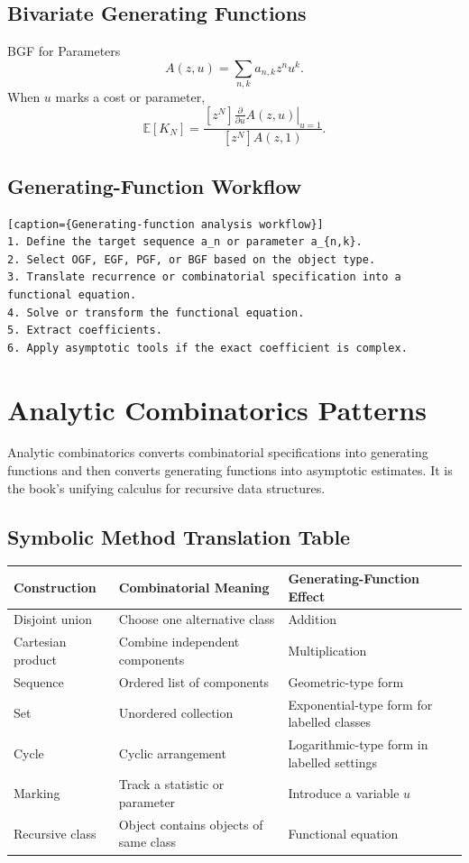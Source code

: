\documentclass[11pt]{article}
\newcommand{\E}{\mathbb{E}}
\begin{document}
\subsection{Bivariate Generating Functions}

\begin{mathbox}{BGF for Parameters}
\[
A(z,u)=\sum_{n,k}a_{n,k}z^nu^k.
\]
When \(u\) marks a cost or parameter,
\[
\E[K_N]
=
\frac{[z^N]\left.\frac{\partial}{\partial u}A(z,u)\right|_{u=1}}
{[z^N]A(z,1)}.
\]
\end{mathbox}

\subsection{Generating-Function Workflow}

\begin{verbatim}[caption={Generating-function analysis workflow}]
1. Define the target sequence a_n or parameter a_{n,k}.
2. Select OGF, EGF, PGF, or BGF based on the object type.
3. Translate recurrence or combinatorial specification into a functional equation.
4. Solve or transform the functional equation.
5. Extract coefficients.
6. Apply asymptotic tools if the exact coefficient is complex.
\end{verbatim}

\section{Analytic Combinatorics Patterns}

Analytic combinatorics converts combinatorial specifications into generating functions and then converts generating functions into asymptotic estimates. It is the book's unifying calculus for recursive data structures.

\subsection{Symbolic Method Translation Table}

\begin{center}
\begin{tabularx}{\textwidth}{L{0.24\textwidth} L{0.25\textwidth} Y}
\toprule
\textbf{Construction} & \textbf{Combinatorial Meaning} & \textbf{Generating-Function Effect} \\
\midrule
Disjoint union & Choose one alternative class & Addition \\
Cartesian product & Combine independent components & Multiplication \\
Sequence & Ordered list of components & Geometric-type form \\
Set & Unordered collection & Exponential-type form for labelled classes \\
Cycle & Cyclic arrangement & Logarithmic-type form in labelled settings \\
Marking & Track a statistic or parameter & Introduce a variable \(u\) \\
Recursive class & Object contains objects of same class & Functional equation \\
\bottomrule
\end{tabularx}
\end{center}
\end{document}
